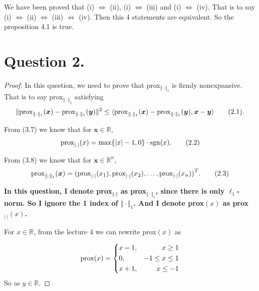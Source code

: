 \documentclass{report}
\begin{document}
\par We have been proved that (i) $\Leftrightarrow$ (ii), (i) $\Leftrightarrow$ (iii) and 
(i) $\Leftrightarrow$ (iv). 
That is to say (i) $\Leftrightarrow$ (ii) $\Leftrightarrow$ (iii) $\Leftrightarrow$ (iv). 
Then this 4 statements are equivalent. 
So the proposition 4.1 is true. 

\newpage

\section*{Question 2.}

\begin{proof}
    In this question, we need to prove that prox$_{\Vert \cdot\Vert_1}$ is firmly nonexpansive. 
    That is to say prox$_{\Vert \cdot\Vert_1}$ satisfying 
    \begin{align}
        \Vert {\rm prox}_{\Vert \cdot\Vert_1}(\bm x) - {\rm prox}_{\Vert \cdot\Vert_1}(\bm y)\Vert^2 \leq \langle {\rm prox}_{\Vert \cdot\Vert_1}(\bm x) - {\rm prox}_{\Vert \cdot\Vert_1}(\bm y),\bm x-\bm y\rangle \tag{2.1}.
    \end{align}

    From (3.7) we know that for $\bm x \in \mathbb{R}$,
    \begin{align}
        {\rm prox}_{|\cdot|}(x)=\max\{|x|-1,0\}\cdot {\rm sgn}(x). \tag{2.2} 
    \end{align}

    From (3.8) we know that for $\bm x \in \mathbb{R}^n $,
    \begin{align}
        {\rm prox}_{\Vert \cdot\Vert_1}(\bm x)={({\rm prox}_{|\cdot|}(x_1),{\rm prox}_{|\cdot|}(x_2),\dots,{\rm prox}_{|\cdot|}(x_n))}^T. \tag{2.3}
    \end{align}

    \vspace{0.5em}
    \par {\bf In this question, I denote prox$_{\Vert \cdot\Vert}$ as prox$_{\Vert \cdot\Vert_1}$, since there is only $\ell_1$-norm. 
    So I ignore the 1 index of $\Vert \cdot\Vert_1$. And I denote prox$(x)$ as prox$_{|\cdot|}(x)$. }

    \par For $x \in \mathbb{R}$, from the lecture 4 we can rewrite prox$(x)$ as 

    \[{\rm prox}(x)=\left\{
        \begin{aligned}
        &x-1,    &x\geq 1 \\
        &0,  &-1\leq x\leq 1 \\
        &x+1,   &x\leq -1
        \end{aligned}
        \right.
    \]
    So as $y \in \mathbb{R}$.


\end{proof}
\end{document}

